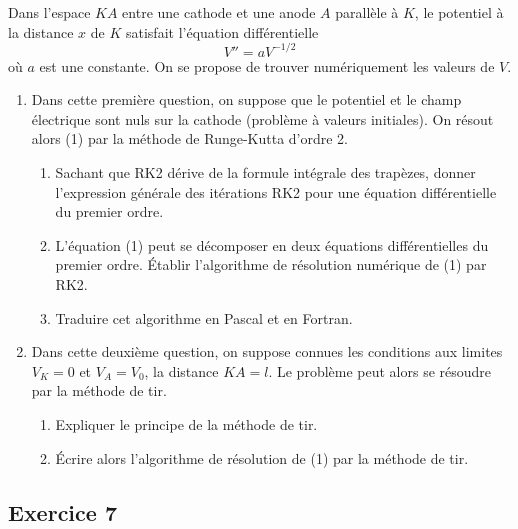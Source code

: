 Dans l'espace $KA$ entre une cathode et une anode $A$ parallèle à $K$, le
potentiel à la distance $x$ de $K$ satisfait l'équation différentielle
\begin{equation}
  V'' = aV^{-1/2}
  \tag{1}
\end{equation}
où $a$ est une constante. On se propose de trouver numériquement les valeurs
de $V$.
\begin{enumerate}[label=\arabic*-]
  \item Dans cette première question, on suppose que le potentiel et le champ
        électrique sont nuls sur la cathode (problème à valeurs initiales). On
        résout alors (1) par la méthode de Runge-Kutta d'ordre 2.
        \begin{enumerate}[label=\alph*-]
          \item Sachant que RK2 dérive de la formule intégrale des trapèzes,
                donner l'expression générale des itérations RK2 pour une
                équation différentielle du premier ordre.
          \item L'équation (1) peut se décomposer en deux équations
                différentielles du premier ordre. Établir l'algorithme de
                résolution numérique de (1) par RK2.
          \item Traduire cet algorithme en Pascal et en Fortran.
        \end{enumerate}
  \item Dans cette deuxième question, on suppose connues les conditions aux
        limites $V_K = 0$ et $V_A = V_0$, la distance $KA = l$. Le problème
        peut alors se résoudre par la méthode de tir.
        \begin{enumerate}[label=\alph*-]
          \item Expliquer le principe de la méthode de tir.
          \item Écrire alors l'algorithme de résolution de (1) par la méthode
                de tir.
        \end{enumerate}
\end{enumerate}

\subsection*{Exercice 7}

